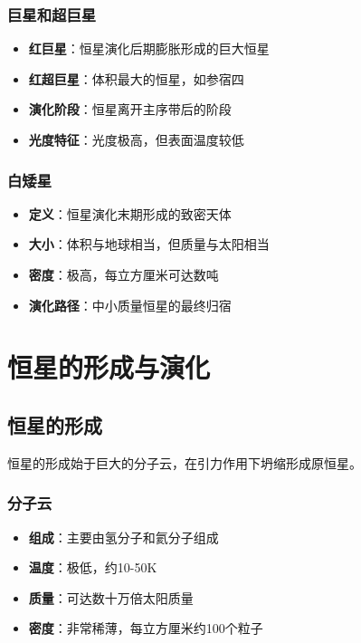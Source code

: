\documentclass[12pt,UTF8]{ctexbook}
\begin{document}
\subsection{巨星和超巨星}

\begin{itemize}
  \item \textbf{红巨星}：恒星演化后期膨胀形成的巨大恒星
  \item \textbf{红超巨星}：体积最大的恒星，如参宿四
  \item \textbf{演化阶段}：恒星离开主序带后的阶段
  \item \textbf{光度特征}：光度极高，但表面温度较低
\end{itemize}

\subsection{白矮星}

\begin{itemize}
  \item \textbf{定义}：恒星演化末期形成的致密天体
  \item \textbf{大小}：体积与地球相当，但质量与太阳相当
  \item \textbf{密度}：极高，每立方厘米可达数吨
  \item \textbf{演化路径}：中小质量恒星的最终归宿
\end{itemize}

\chapter{恒星的形成与演化}
\section{恒星的形成}

恒星的形成始于巨大的分子云，在引力作用下坍缩形成原恒星。

\subsection{分子云}

\begin{itemize}
  \item \textbf{组成}：主要由氢分子和氦分子组成
  \item \textbf{温度}：极低，约10-50K
  \item \textbf{质量}：可达数十万倍太阳质量
  \item \textbf{密度}：非常稀薄，每立方厘米约100个粒子
\end{itemize}
\end{document}
